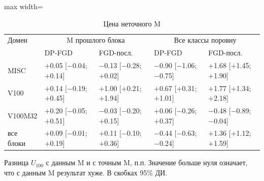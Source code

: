 \begin{table}[htbp]
\centering
\small
\caption{Цена неточного M}
\label{tab:mcost}
\begin{adjustbox}{max width=\textwidth}
\begin{tabular}{lllll}
\toprule
Домен & \multicolumn{2}{c}{M прошлого блока} & \multicolumn{2}{c}{Все классы поровну} \\
 & DP-FGD & FGD-посл. & DP-FGD & FGD-посл. \\
\midrule
MISC & \(+\)0.05 [\(-\)0.04; \(+\)0.14] & \(-\)0.13 [\(-\)0.28; \(+\)0.02] & \(-\)0.90 [\(-\)1.06; \(-\)0.75] & \(+\)1.68 [\(+\)1.45; \(+\)1.90] \\
V100 & \(+\)0.14 [\(-\)0.19; \(+\)0.45] & \(+\)1.00 [\(+\)0.21; \(+\)1.94] & \(+\)0.67 [\(+\)0.31; \(+\)1.01] & \(+\)1.77 [\(+\)1.34; \(+\)2.18] \\
V100M32 & \(+\)0.20 [\(-\)0.05; \(+\)0.51] & \(-\)0.03 [\(-\)0.20; \(+\)0.15] & \(+\)0.06 [\(-\)0.26; \(+\)0.37] & \(-\)0.48 [\(-\)0.89; \(-\)0.04] \\
\midrule
все блоки & \(+\)0.09 [\(-\)0.01; \(+\)0.19] & \(+\)0.11 [\(-\)0.10; \(+\)0.36] & \(-\)0.44 [\(-\)0.63; \(-\)0.24] & \(+\)1.36 [\(+\)1.12; \(+\)1.59] \\
\bottomrule
\end{tabular}
\end{adjustbox}
\par\smallskip
\parbox{0.95\textwidth}{\footnotesize Разница \(U_{100}\) с данным M и с точным M, п.п. Значение больше нуля означает, что с данным M результат хуже. В скобках 95\% ДИ.}
\end{table}
